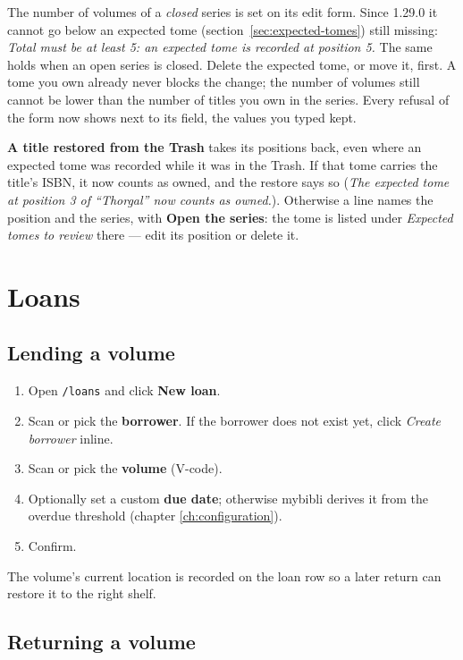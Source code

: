 The number of volumes of a \emph{closed} series is set on its edit
form. Since 1.29.0 it cannot go below an expected tome
(section~\ref{sec:expected-tomes}) still missing: \emph{Total must be
at least 5: an expected tome is recorded at position 5.} The same
holds when an open series is closed. Delete the expected tome, or move
it, first. A tome you own already never blocks the change; the number
of volumes still cannot be lower than the number of titles you own in
the series. Every refusal of the form now shows next to its field, the
values you typed kept.

\textbf{A title restored from the Trash} takes its positions back, even
where an expected tome was recorded while it was in the Trash. If that
tome carries the title's ISBN, it now counts as owned, and the restore
says so (\emph{The expected tome at position 3 of ``Thorgal'' now counts
as owned.}). Otherwise a line names the position and the series, with
\textbf{Open the series}: the tome is listed under \emph{Expected tomes
to review} there --- edit its position or delete it.

\section{Loans}\label{sec:loans}

\subsection*{Lending a volume}

\begin{enumerate}
  \item Open \texttt{/loans} and click \textbf{New loan}.
  \item Scan or pick the \textbf{borrower}. If the
        borrower does not exist yet, click \emph{Create borrower}
        inline.
  \item Scan or pick the \textbf{volume} (V-code).
  \item Optionally set a custom \textbf{due date}; otherwise mybibli
        derives it from the overdue threshold (chapter
        \ref{ch:configuration}).
  \item Confirm.
\end{enumerate}

The volume's current location is recorded on the loan row so a
later return can restore it to the right shelf.

\subsection*{Returning a volume}

